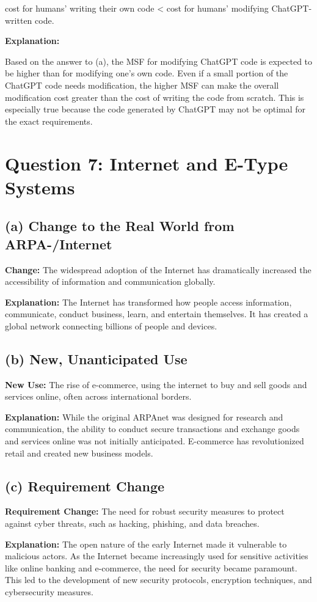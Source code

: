 \documentclass{article}
\begin{document}
cost for humans' writing their own code < cost for humans' modifying ChatGPT-written code. \checkmark

\textbf{Explanation:}

Based on the answer to (a), the MSF for modifying ChatGPT code is expected to be higher than for modifying one's own code. Even if a small portion of the ChatGPT code needs modification, the higher MSF can make the overall modification cost greater than the cost of writing the code from scratch. This is especially true because the code generated by ChatGPT may not be optimal for the exact requirements.

\section*{Question 7: Internet and E-Type Systems}

\subsection*{(a) Change to the Real World from ARPA-/Internet}

\textbf{Change:} The widespread adoption of the Internet has dramatically increased the accessibility of information and communication globally.

\textbf{Explanation:} The Internet has transformed how people access information, communicate, conduct business, learn, and entertain themselves. It has created a global network connecting billions of people and devices.

\subsection*{(b) New, Unanticipated Use}

\textbf{New Use:} The rise of e-commerce, using the internet to buy and sell goods and services online, often across international borders.

\textbf{Explanation:} While the original ARPAnet was designed for research and communication, the ability to conduct secure transactions and exchange goods and services online was not initially anticipated. E-commerce has revolutionized retail and created new business models.

\subsection*{(c) Requirement Change}

\textbf{Requirement Change:} The need for robust security measures to protect against cyber threats, such as hacking, phishing, and data breaches.

\textbf{Explanation:} The open nature of the early Internet made it vulnerable to malicious actors. As the Internet became increasingly used for sensitive activities like online banking and e-commerce, the need for security became paramount. This led to the development of new security protocols, encryption techniques, and cybersecurity measures.
\end{document}
